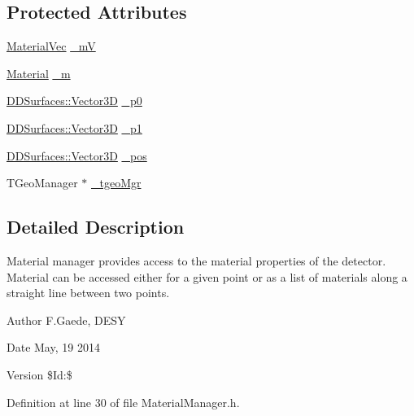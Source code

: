 \subsection*{Protected Attributes}
\begin{DoxyCompactItemize}
\item 
\hyperlink{namespace_d_d4hep_1_1_d_d_rec_a69fdab2f851316d2b9e50956920359f7}{MaterialVec} \hyperlink{class_d_d4hep_1_1_d_d_rec_1_1_material_manager_ad0ce589d4286c2392a208ec8a09455e4}{\_\-mV}
\item 
\hyperlink{class_d_d4hep_1_1_geometry_1_1_material}{Material} \hyperlink{class_d_d4hep_1_1_d_d_rec_1_1_material_manager_a9959722f6a2058c3058c1bc06660f8f1}{\_\-m}
\item 
\hyperlink{class_d_d_surfaces_1_1_vector3_d}{DDSurfaces::Vector3D} \hyperlink{class_d_d4hep_1_1_d_d_rec_1_1_material_manager_a0d1a1b73cd506aa5a530dc90cf1bd88c}{\_\-p0}
\item 
\hyperlink{class_d_d_surfaces_1_1_vector3_d}{DDSurfaces::Vector3D} \hyperlink{class_d_d4hep_1_1_d_d_rec_1_1_material_manager_a64db267d786f4371f8cf9ba5d9c805d3}{\_\-p1}
\item 
\hyperlink{class_d_d_surfaces_1_1_vector3_d}{DDSurfaces::Vector3D} \hyperlink{class_d_d4hep_1_1_d_d_rec_1_1_material_manager_a5ca78ff1887167e4173c1a4767835c6f}{\_\-pos}
\item 
TGeoManager $\ast$ \hyperlink{class_d_d4hep_1_1_d_d_rec_1_1_material_manager_aa5845dcf0e2d024c17250afa50f3bfb8}{\_\-tgeoMgr}
\end{DoxyCompactItemize}


\subsection{Detailed Description}
Material manager provides access to the material properties of the detector. Material can be accessed either for a given point or as a list of materials along a straight line between two points.

\begin{DoxyAuthor}{Author}
F.Gaede, DESY 
\end{DoxyAuthor}
\begin{DoxyDate}{Date}
May, 19 2014 
\end{DoxyDate}
\begin{DoxyVersion}{Version}
\$Id:\$ 
\end{DoxyVersion}


Definition at line 30 of file MaterialManager.h.

